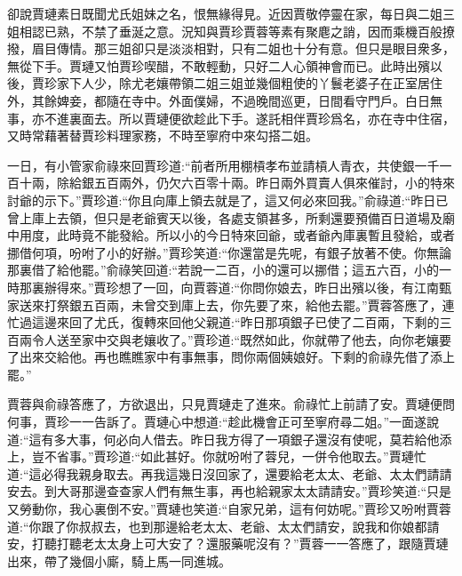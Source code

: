 \begin{parag}
    卻說賈璉素日既聞尤氏姐妹之名，恨無緣得見。近因賈敬停靈在家，每日與二姐三姐相認已熟，不禁了垂涎之意。況知與賈珍賈蓉等素有聚麀之誚，因而乘機百般撩撥，眉目傳情。那三姐卻只是淡淡相對，只有二姐也十分有意。但只是眼目衆多，無從下手。賈璉又怕賈珍喫醋，不敢輕動，只好二人心領神會而已。此時出殯以後，賈珍家下人少，除尤老孃帶領二姐三姐並幾個粗使的丫鬟老婆子在正室居住外，其餘婢妾，都隨在寺中。外面僕婦，不過晚間巡更，日間看守門戶。白日無事，亦不進裏面去。所以賈璉便欲趁此下手。遂託相伴賈珍爲名，亦在寺中住宿，又時常藉著替賈珍料理家務，不時至寧府中來勾搭二姐。
\end{parag}


\begin{parag}
    一日，有小管家俞祿來回賈珍道:“前者所用棚槓孝布並請槓人青衣，共使銀一千一百十兩，除給銀五百兩外，仍欠六百零十兩。昨日兩外買賣人俱來催討，小的特來討爺的示下。”賈珍道:“你且向庫上領去就是了，這又何必來回我。”俞祿道:“昨日已曾上庫上去領，但只是老爺賓天以後，各處支領甚多，所剩還要預備百日道場及廟中用度，此時竟不能發給。所以小的今日特來回爺，或者爺內庫裏暫且發給，或者挪借何項，吩咐了小的好辦。”賈珍笑道:“你還當是先呢，有銀子放著不使。你無論那裏借了給他罷。”俞祿笑回道:“若說一二百，小的還可以挪借；這五六百，小的一時那裏辦得來。”賈珍想了一回，向賈蓉道:“你問你娘去，昨日出殯以後，有江南甄家送來打祭銀五百兩，未曾交到庫上去，你先要了來，給他去罷。”賈蓉答應了，連忙過這邊來回了尤氏，復轉來回他父親道:“昨日那項銀子已使了二百兩，下剩的三百兩令人送至家中交與老孃收了。”賈珍道:“既然如此，你就帶了他去，向你老孃要了出來交給他。再也瞧瞧家中有事無事，問你兩個姨娘好。下剩的俞祿先借了添上罷。”
\end{parag}


\begin{parag}
    賈蓉與俞祿答應了，方欲退出，只見賈璉走了進來。俞祿忙上前請了安。賈璉便問何事，賈珍一一告訴了。賈璉心中想道:“趁此機會正可至寧府尋二姐。”一面遂說道:“這有多大事，何必向人借去。昨日我方得了一項銀子還沒有使呢，莫若給他添上，豈不省事。”賈珍道:“如此甚好。你就吩咐了蓉兒，一併令他取去。”賈璉忙道:“這必得我親身取去。再我這幾日沒回家了，還要給老太太、老爺、太太們請請安去。到大哥那邊查查家人們有無生事，再也給親家太太請請安。”賈珍笑道:“只是又勞動你，我心裏倒不安。”賈璉也笑道:“自家兄弟，這有何妨呢。”賈珍又吩咐賈蓉道:“你跟了你叔叔去，也到那邊給老太太、老爺、太太們請安，說我和你娘都請安，打聽打聽老太太身上可大安了？還服藥呢沒有？”賈蓉一一答應了，跟隨賈璉出來，帶了幾個小廝，騎上馬一同進城。
\end{parag}


